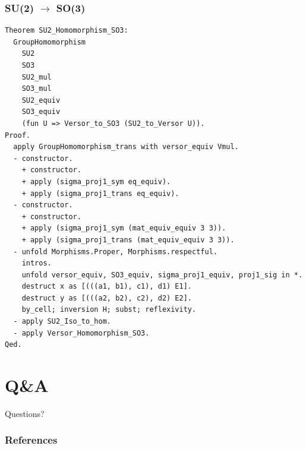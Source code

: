 \documentclass{beamer}
\begin{document}
\begin{frame}[fragile]
\frametitle{SU(2) $\to$ SO(3)}
\begin{lstlisting}[language=Coq, basicstyle=\tiny]
Theorem SU2_Homomorphism_SO3:
  GroupHomomorphism
    SU2
    SO3
    SU2_mul
    SO3_mul
    SU2_equiv
    SO3_equiv
    (fun U => Versor_to_SO3 (SU2_to_Versor U)).
Proof.
  apply GroupHomomorphism_trans with versor_equiv Vmul.
  - constructor.
    + constructor.
    + apply (sigma_proj1_sym eq_equiv).
    + apply (sigma_proj1_trans eq_equiv).
  - constructor.
    + constructor.
    + apply (sigma_proj1_sym (mat_equiv_equiv 3 3)).
    + apply (sigma_proj1_trans (mat_equiv_equiv 3 3)).
  - unfold Morphisms.Proper, Morphisms.respectful.
    intros.
    unfold versor_equiv, SO3_equiv, sigma_proj1_equiv, proj1_sig in *.
    destruct x as [(((a1, b1), c1), d1) E1].
    destruct y as [(((a2, b2), c2), d2) E2].
    by_cell; inversion H; subst; reflexivity.
  - apply SU2_Iso_to_hom.
  - apply Versor_Homomorphism_SO3.
Qed.
\end{lstlisting}
\end{frame}

\section{Q\&A}

\begin{frame}[c]
\begin{center}
\Huge Questions?
\end{center}
\end{frame}

\begin{frame}[allowframebreaks]
        \frametitle{References}
        
        
\end{frame}
\end{document}
